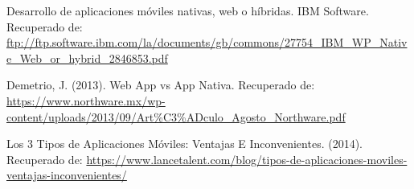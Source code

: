 \begin{thebibliography}{0}
	 Desarrollo de aplicaciones móviles nativas, web o híbridas. IBM Software. Recuperado de: \url{ftp://ftp.software.ibm.com/la/documents/gb/commons/27754_IBM_WP_Native_Web_or_hybrid_2846853.pdf}
	
	 Demetrio, J. (2013). Web App vs App Nativa. Recuperado de: \url{https://www.northware.mx/wp-content/uploads/2013/09/Art%C3%ADculo_Agosto_Northware.pdf}
		
	 Los 3 Tipos de Aplicaciones Móviles: Ventajas E Inconvenientes. (2014). Recuperado de: \url{https://www.lancetalent.com/blog/tipos-de-aplicaciones-moviles-ventajas-inconvenientes/}
	
\end{thebibliography}